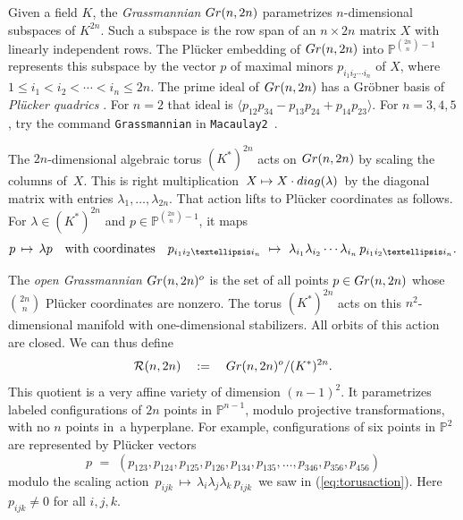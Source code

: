\documentclass[12pt]{extarticle}
\theoremstyle{definition}
\numberwithin{theorem}{section}
\theoremstyle{plain}\newtheorem{ithm}{Theorem}
\newcommand{\PP}{\mathbb{P}}
\begin{document}
Given a field $K$,
the {\em Grassmannian} ${\rm Gr}(n,2n)$ parametrizes
$n$-dimensional subspaces of $K^{2n}$.
Such a subspace is the row span of an
$n \times 2n$ matrix $X$ with linearly independent rows.
The Pl\"ucker embedding of ${\rm Gr}(n,2n) $ into $ \PP^{\binom{2n}{n}-1}$
represents this subspace by the vector $p$ of maximal minors $p_{i_1 i_2 \cdots i_n}$ of $X$,
where $1 \leq i_1 < i_2 < \cdots < i_n \leq 2n$.
The prime ideal of ${\rm Gr}(n,2n)$ has a Gr\"obner basis of
  {\em Pl\"ucker quadrics}
\cite[Theorem 3.1.7]{AIT}. 
For  $n=2$ that ideal is
$\langle p_{12} p_{34} - p_{13} p_{24} + p_{14} p_{23}  \rangle$.
For $n=3,4,5$, try
the command {\tt Grassmannian} in {\tt Macaulay2}~\cite{M2}.

\smallskip

The ${2n}$-dimensional algebraic torus $(K^*)^{2n}$ acts on ${\rm Gr}(n,2n)$
by scaling the columns of~$X$. This is right multiplication 
 $\,X \mapsto X \cdot {\rm diag}(\lambda)\,$ by the diagonal matrix
 with entries $\lambda_1,\ldots,\lambda_{2n}$.
That action lifts to Pl\"ucker coordinates as follows.
For $\lambda \in (K^*)^{2n}$ and $p \in \PP^{\binom{2n}{n}-1}$, it maps
\begin{equation}
\label{eq:torusaction} 
p \,\mapsto \,\lambda p \quad \hbox{with coordinates} \quad p_{i_1 i_2 \ldots i_n} \,\, \mapsto \,\,
\lambda_{i_1} \lambda_{i_2} \cdots \lambda_{i_n}\, p_{i_1 i_2 \ldots i_n}  .
\end{equation}


The  {\em open Grassmannian} ${\rm Gr}(n,2n)^o$ is the set of all points
 $p \in {\rm Gr}(n,2n)$ whose $\binom{2n}{n}$ Pl\"ucker coordinates are nonzero.
 The torus $(K^*)^{2n}$ acts on this $n^2$-dimensional manifold 
with one-dimensional stabilizers.
All orbits of this action are closed. We can thus define
\begin{equation}
\label{eq:Rn2n}
 \mathcal{R}(n,2n) \quad := \quad {\rm Gr}(n,2n)^o/(K^*)^{2n}. 
 \end{equation}
 This quotient  is a very affine variety of dimension $(n-1)^2$.
It parametrizes
  labeled configurations of $2n$ points in $\PP^{n-1}$,
modulo projective transformations, with
no $n$ points  in~a hyperplane.
For example, configurations of six points in $\PP^2$ are represented
 by Pl\"ucker vectors
 \begin{equation}
 \label{eq:pvec}
 p \,\,= \,\,(  p_{123},  p_{124}, p_{125},p_{126},p_{134}, p_{135},\ldots, p_{346}, p_{356}, p_{456}) 
 \end{equation}
 modulo the scaling action 
 $\,p_{ijk}\, \mapsto \,\lambda_i \lambda_j \lambda_k \,p_{ijk}\,$ we
 saw in (\ref{eq:torusaction}).
 Here $p_{ijk} \not= 0$ for all $i,j,k$.
 
\end{document}
